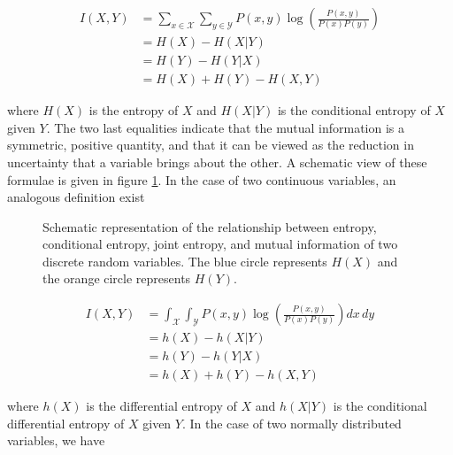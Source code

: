 \begin{align}
    I(X, Y) &= \sum_{x\in\mathcal X}\sum_{y\in\mathcal Y}
    P(x, y) \log\left(\frac{P(x, y)}{P(x)P(y)}\right)\label{eq:mi_discrete}\\
    &= H(X) - H(X|Y)\\
    &= H(Y) - H(Y|X)\\
    &=H(X) + H(Y) - H(X, Y)
\end{align}

where $H(X)$ is the entropy of $X$ and $H(X|Y)$ is the conditional entropy of
$X$ given $Y$\parencite{shannon1948mathematical}. The two last equalities
indicate that the mutual information is a symmetric, positive quantity, and
that it can be viewed as the reduction in uncertainty that a variable brings
about the other. A schematic view of these formulae is given in figure
\ref{fig:mi_schematic}. In the case of two continuous variables, an analogous
definition exist \parencite{kolmogorov1956shannon}

\begin{figure}
    \centering
    \caption{Schematic representation of the relationship between entropy,
    conditional entropy, joint entropy, and mutual information of two discrete
    random variables. The blue circle represents $H(X)$ and the orange circle
    represents $H(Y)$.}
    \label{fig:mi_schematic}
\end{figure}

\begin{align}
    I(X, Y) &= \int_\mathcal X\int_\mathcal Y
    P(x, y) \log\left(\frac{P(x, y)}{P(x)P(y)}\right)dx\,dy\\
    &= h(X) - h(X|Y)\\
    &= h(Y) - h(Y|X)\\
    &= h(X) + h(Y) - h(X, Y)
\end{align}

where $h(X)$ is the differential entropy of $X$ and $h(X|Y)$ is the conditional
differential entropy of $X$ given $Y$. In the case of two normally distributed
variables, we have

